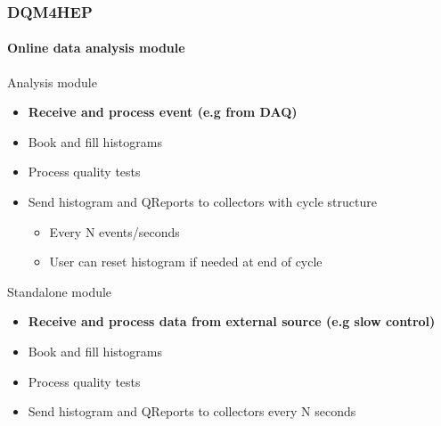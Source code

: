 \documentclass[presentation, 10pt]{beamer}
\begin{document}
\begin{frame}
  \frametitle{DQM4HEP}
  \framesubtitle{Online data analysis module}
  \scriptsize
  \begin{block}{Analysis module}
    \begin{itemize}
      \item \textbf{Receive and process event (e.g from DAQ)}
      \item Book and fill histograms
      \item Process quality tests
      \item Send histogram and QReports to collectors with cycle structure
      \begin{itemize}
        \scriptsize
        \item Every N events/seconds
        \item User can reset histogram if needed at end of cycle
      \end{itemize}
    \end{itemize}
  \end{block}
  \begin{block}{Standalone module}
    \begin{itemize}
      \item \textbf{Receive and process data from external source (e.g slow control)}
      \item Book and fill histograms
      \item Process quality tests
      \item Send histogram and QReports to collectors every N seconds
    \end{itemize}
  \end{block}
\end{frame}


\end{document}

